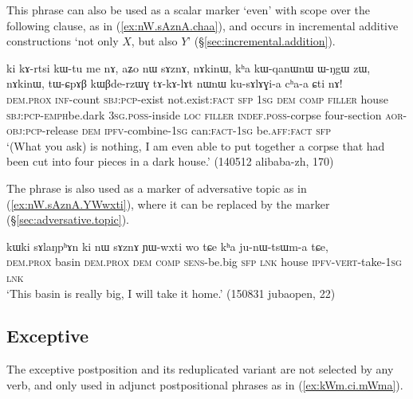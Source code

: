 This phrase can also be used as a scalar marker `even' with scope over the following clause, as in (\ref{ex:nW.sAznA.chaa}), and occurs in incremental additive constructions `not only $X$, but also $Y$' (§\ref{sec:incremental.addition}).
 

 \begin{exe}
 \ex \label{ex:nW.sAznA.chaa}
 \gll ki kɤ-rtsi kɯ-tu me nɤ, aʑo nɯ sɤznɤ, nɤkinɯ, kʰa kɯ-qanɯ\redp{}nɯ ɯ-ŋgɯ zɯ, nɤkinɯ, tɯ-ɕpɤβ kɯβde-rzɯɣ tɤ-kɤ-lɤt nɯnɯ ku-sɤlɤɣi-a cʰa-a ɕti nɤ! \\
 \textsc{dem}.\textsc{prox} \textsc{inf}-count \textsc{sbj}:\textsc{pcp}-exist not.exist:\textsc{fact} \textsc{sfp} \textsc{1sg} \textsc{dem} \textsc{comp} \textsc{filler} house   \textsc{sbj}:\textsc{pcp}-\textsc{emph}\redp{}be.dark \textsc{3sg}.\textsc{poss}-inside \textsc{loc}  \textsc{filler} \textsc{indef}.\textsc{poss}-corpse four-section \textsc{aor}-\textsc{obj}:\textsc{pcp}-release \textsc{dem} \textsc{ipfv}-combine-\textsc{1sg} can:\textsc{fact}-\textsc{1sg} be.\textsc{aff}:\textsc{fact} \textsc{sfp}  \\
\glt  `(What you ask) is nothing, I am even able to put together a corpse that had been cut into four pieces in a dark house.'  (140512 alibaba-zh, 170)
\end{exe}

The phrase  is also used as a marker of adversative topic as in (\ref{ex:nW.sAznA.YWwxti}), where it can be replaced by the marker  (§\ref{sec:adversative.topic}).

\begin{exe}
\ex \label{ex:nW.sAznA.YWwxti}
\gll kɯki sɤlaŋpʰɤn ki nɯ sɤznɤ ɲɯ-wxti wo tɕe kʰa ju-nɯ-tsɯm-a tɕe, \\
\textsc{dem}.\textsc{prox} basin \textsc{dem}.\textsc{prox}  \textsc{dem} \textsc{comp}  \textsc{sens}-be.big \textsc{sfp} \textsc{lnk} house \textsc{ipfv}-\textsc{vert}-take-\textsc{1sg} \textsc{lnk} \\
\glt `This basin is really big, I will take it home.' (150831 jubaopen, 22)
\end{exe}

\subsection{Exceptive} \label{sec:exceptive} %
The exceptive postposition  and its reduplicated variant  are not selected by any verb, and only used in adjunct postpositional phrases as in (\ref{ex:kWm.ci.mWma}).

